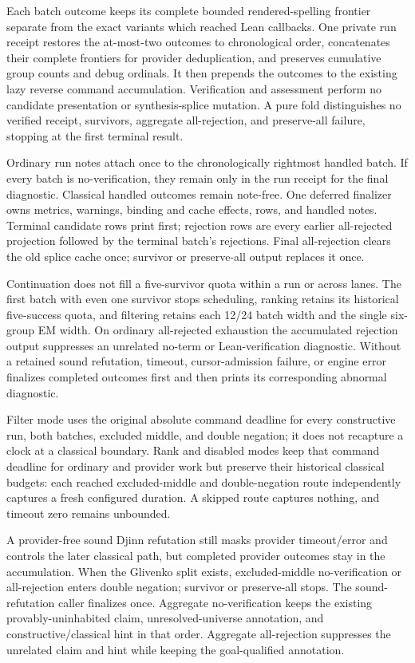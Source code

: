 \documentclass[11pt,oneside]{article}
\begin{document}
Each batch outcome keeps its complete bounded rendered-spelling frontier
separate from the exact variants which reached Lean callbacks. One private run
receipt restores the at-most-two outcomes to chronological order, concatenates
their complete frontiers for provider deduplication, and preserves cumulative
group counts and debug ordinals. It then prepends the outcomes to the existing
lazy reverse command accumulation. Verification and assessment perform no
candidate presentation or synthesis-splice mutation. A pure fold distinguishes
no verified receipt, survivors, aggregate all-rejection, and preserve-all
failure, stopping at the first terminal result.

Ordinary run notes attach once to the chronologically rightmost handled batch.
If every batch is no-verification, they remain only in the run receipt for the
final diagnostic. Classical handled outcomes remain note-free. One deferred
finalizer owns metrics, warnings, binding and cache effects, rows, and handled
notes. Terminal candidate rows print first; rejection rows are every earlier
all-rejected projection followed by the terminal batch's rejections. Final
all-rejection clears the old splice cache once; survivor or preserve-all output
replaces it once.

Continuation does not fill a five-survivor quota within a run or across lanes.
The first batch with even one survivor stops scheduling, ranking retains its
historical five-success quota, and filtering retains each 12/24 batch width and
the single six-group EM width. On ordinary
all-rejected exhaustion the accumulated rejection output suppresses an
unrelated no-term or Lean-verification diagnostic. Without a retained sound
refutation, timeout, cursor-admission failure, or engine error finalizes
completed outcomes first and then prints its corresponding abnormal diagnostic.

Filter mode uses the original absolute command deadline for every constructive
run, both batches, excluded middle, and double negation; it does not recapture a
clock at a classical boundary. Rank and disabled modes keep that command
deadline for ordinary and provider work but preserve their historical
classical budgets: each reached excluded-middle and double-negation route
independently captures a fresh configured duration. A skipped route captures
nothing, and timeout zero remains unbounded.

A provider-free sound Djinn refutation still masks provider timeout/error and
controls the later classical path, but completed provider outcomes stay in the
accumulation. When the Glivenko split exists, excluded-middle no-verification
or all-rejection enters double negation; survivor or preserve-all stops. The
sound-refutation caller finalizes once. Aggregate no-verification keeps the
existing provably-uninhabited claim, unresolved-universe annotation, and
constructive/classical hint in that order. Aggregate all-rejection suppresses
the unrelated claim and hint while keeping the goal-qualified annotation.
\end{document}
